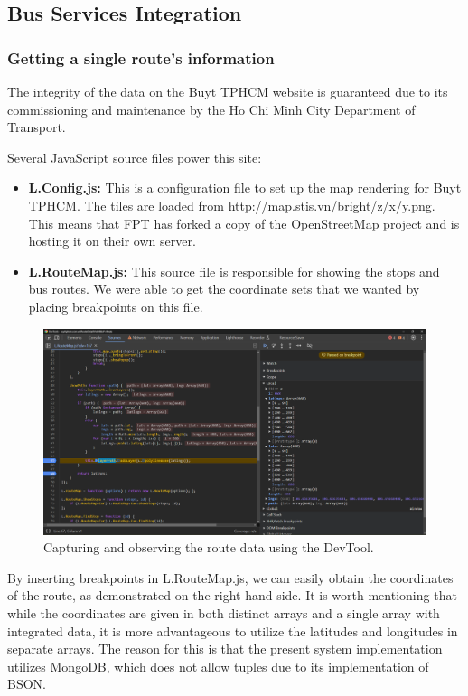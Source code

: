 \subsection{Bus Services Integration}

\subsubsection{Getting a single route's information}

The integrity of the data on the Buyt TPHCM website is guaranteed due to its commissioning and maintenance by the Ho Chi Minh City Department of Transport. 

Several JavaScript source files power this site:
\begin{itemize}
    \item \textbf{L.Config.js:} This is a configuration file to set up the map rendering for Buyt TPHCM. The tiles are loaded from http://map.stis.vn/bright/{z}/{x}/{y}.png. This means that FPT has forked a copy of the OpenStreetMap project and is hosting it on their own server.
    \item \textbf{L.RouteMap.js:} This source file is responsible for showing the stops and bus routes. We were able to get the coordinate sets that we wanted by placing breakpoints on this file.
\end{itemize}

\begin{figure}[H]
    \centering
    \includegraphics[width=\textwidth]{assets/images/Research/Bus/lat_long_web.png}
    \caption{Capturing and observing the route data using the DevTool.}
    \label{fig:lat_long_web}
\end{figure}

By inserting breakpoints in L.RouteMap.js, we can easily obtain the coordinates of the route, as demonstrated on the right-hand side. It is worth mentioning that while the coordinates are given in both distinct arrays and a single array with integrated data, it is more advantageous to utilize the latitudes and longitudes in separate arrays. The reason for this is that the present system implementation utilizes MongoDB, which does not allow tuples due to its implementation of BSON.

